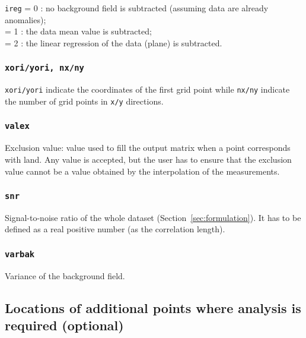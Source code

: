 \texttt{ireg}             = 0 \qquad: no background field is subtracted (assuming data are already anomalies); \\
  = 1 \qquad: the data mean value is subtracted;\\
  = 2 \qquad: the linear regression of the data (plane) is subtracted.

\subsubsection{\texttt{xori/yori, nx/ny}}

\texttt{xori/yori} indicate the coordinates of the first grid point while \texttt{nx/ny} indicate the number of grid points in \texttt{x/y} directions.



\subsubsection{\texttt{valex}}

Exclusion value: value used to fill the output matrix when a point corresponds with land. Any value is accepted, but the user has to ensure that the exclusion value cannot be a value obtained by the interpolation of the measurements. 


\subsubsection{\texttt{snr}}

Signal-to-noise ratio of the whole dataset (Section~\ref{sec:formulation}). It has to be defined as a real positive number (as the correlation length).

\subsubsection{\texttt{varbak}}

Variance of the background field. 

\subsection[Additional points of analysis]{Locations of additional points where analysis is required (optional)}

